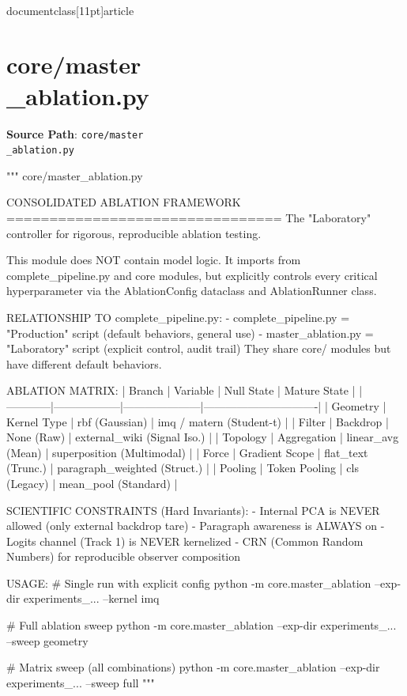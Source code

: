 \\documentclass[11pt]{article}
\begin{document}
\section*{core/master\\_ablation.py}
\textbf{Source Path}: \texttt{core/master\\_ablation.py}\par
\bigskip
\begin{CodeBlock}
"""
core/master_ablation.py

CONSOLIDATED ABLATION FRAMEWORK
================================
The "Laboratory" controller for rigorous, reproducible ablation testing.

This module does NOT contain model logic. It imports from complete_pipeline.py
and core modules, but explicitly controls every critical hyperparameter via
the AblationConfig dataclass and AblationRunner class.

RELATIONSHIP TO complete_pipeline.py:
- complete_pipeline.py = "Production" script (default behaviors, general use)
- master_ablation.py   = "Laboratory" script (explicit control, audit trail)
They share core/ modules but have different default behaviors.

ABLATION MATRIX:
| Branch     | Variable         | Null State          | Mature State                  |
|------------|------------------|---------------------|-------------------------------|
| Geometry   | Kernel Type      | rbf (Gaussian)      | imq / matern (Student-t)      |
| Filter     | Backdrop         | None (Raw)          | external_wiki (Signal Iso.)   |
| Topology   | Aggregation      | linear_avg (Mean)   | superposition (Multimodal)    |
| Force      | Gradient Scope   | flat_text (Trunc.)  | paragraph_weighted (Struct.)  |
| Pooling    | Token Pooling    | cls (Legacy)        | mean_pool (Standard)          |

SCIENTIFIC CONSTRAINTS (Hard Invariants):
- Internal PCA is NEVER allowed (only external backdrop tare)
- Paragraph awareness is ALWAYS on
- Logits channel (Track 1) is NEVER kernelized
- CRN (Common Random Numbers) for reproducible observer composition

USAGE:
  # Single run with explicit config
  python -m core.master_ablation --exp-dir experiments_... --kernel imq

  # Full ablation sweep
  python -m core.master_ablation --exp-dir experiments_... --sweep geometry

  # Matrix sweep (all combinations)
  python -m core.master_ablation --exp-dir experiments_... --sweep full
"""


\end{CodeBlock}
\end{document}
